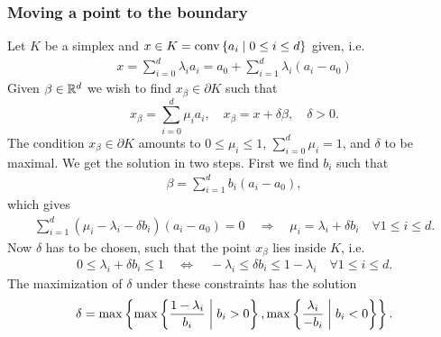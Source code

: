 \subsubsection{Moving a point to the boundary}
%
Let $K$ be a simplex and $x\in K=\operatorname{conv}\left\{a_i\;\middle|\;0\le i\le d\right\}$ given, i.e.
%
\begin{align*}
x = \sum_{i=0}^d \lambda_i a_i = a_0 + \sum_{i=1}^d \lambda_i (a_i-a_0)
\end{align*}
%
Given $\beta\in\mathbb R^d$ we wish to find $x_{\beta}\in\partial K$ such that
%
\begin{equation}\label{eq:fem_upw_target}
x_{\beta} = \sum_{i=0}^d \mu_i a_i,\quad x_{\beta} = x + \delta \beta,\quad \delta>0.
\end{equation}
%
The condition $x_{\beta}\in\partial K$ amounts to $0\le \mu_i\le 1$, $\sum_{i=0}^d\mu_i=1$, and $\delta$ to be maximal.
We get the solution in two steps. First we find $b_i$ such that
%
\begin{align*}
\beta = \sum_{i=1}^d b_i (a_i-a_0),
\end{align*}
%
which gives
%
\begin{align*}
\sum_{i=1}^d (\mu_i - \lambda_i - \delta b_i) (a_i-a_0)=0\quad\Rightarrow\quad \mu_i = \lambda_i + \delta b_i\quad \forall 1\le i\le d.
\end{align*}
%
Now $\delta$ has to be chosen, such that the point $x_{\beta}$ lies inside $K$, i.e.
%
\begin{align*}
0 \le \lambda_i + \delta b_i \le 1 \quad\Leftrightarrow\quad -\lambda_i \le  \delta b_i \le 1-\lambda_i\quad \forall 1\le i\le d.
\end{align*}
%
The maximization of $\delta$ under these constraints has the solution
%
%
\begin{equation}\label{eq:fem_upw_sol}
\delta = \max \left\{ \max\left\{\frac{1-\lambda_i}{b_i}\;\middle|\;b_i>0\right\},  \max\left\{\frac{\lambda_i}{-b_i}\;\middle|\;b_i<0\right\}\right\}.
\end{equation}
%
%





\printbibliography[title=References Section~\thesection]

